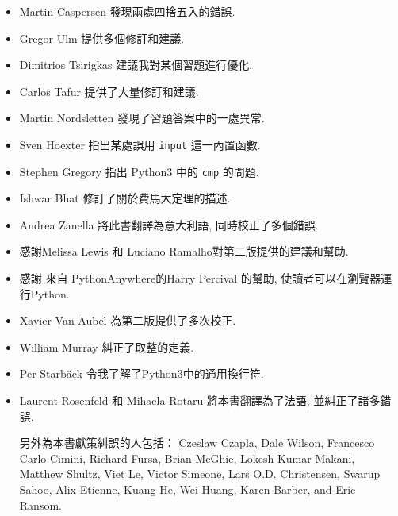 \documentclass[10pt]{book}
\begin{document}
\begin{itemize}
\item Martin Caspersen 發現兩處四捨五入的錯誤. 

\item Gregor Ulm 提供多個修訂和建議. 

\item Dimitrios Tsirigkas 建議我對某個習題進行優化. 

\item Carlos Tafur 提供了大量修訂和建議. 

\item Martin Nordsletten 發現了習題答案中的一處異常. 

\item Sven Hoexter 指出某處誤用 {\tt input} 這一內置函數. 

\item Stephen Gregory 指出 Python3 中的 {\tt cmp} 的問題. 

\item Ishwar Bhat 修訂了關於費馬大定理的描述. 

\item Andrea Zanella 將此書翻譯為意大利語, 同時校正了多個錯誤. 


\item 感謝Melissa Lewis 和 Luciano Ramalho對第二版提供的建議和幫助. 

\item 感謝 來自 PythonAnywhere的Harry Percival 的幫助, 使讀者可以在瀏覽器運行Python. 

\item Xavier Van Aubel 為第二版提供了多次校正. 

\item William Murray 糾正了取整的定義. 

\item Per Starb{\"a}ck 令我了解了Python3中的通用換行符. 

\item Laurent Rosenfeld 和 Mihaela Rotaru 將本書翻譯為了法語, 並糾正了諸多錯誤. 


另外為本書獻策糾誤的人包括：
Czeslaw Czapla, Dale Wilson, Francesco Carlo Cimini,
Richard Fursa, Brian McGhie, Lokesh Kumar Makani, Matthew Shultz, Viet
Le, Victor Simeone, Lars O.D. Christensen, Swarup Sahoo, Alix Etienne,
Kuang He, Wei Huang, Karen Barber, and Eric Ransom. 



\end{itemize}

\normalsize
\clearemptydoublepage
\end{document}
